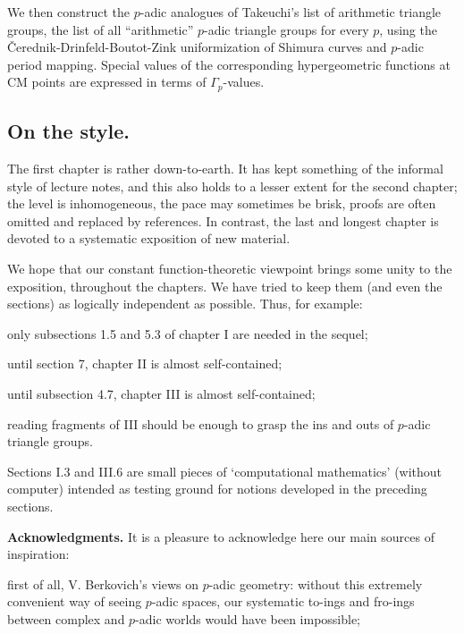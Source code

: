 We then construct the $p$-adic analogues of Takeuchi's list of
arithmetic triangle groups, \ie the list of all ``arithmetic'' $p$-adic
triangle groups for every $p$, using the 
\v{C}erednik-Drinfeld-Boutot-Zink uniformization of Shimura curves and
$p$-adic period mapping. Special values of the corresponding
hypergeometric functions at CM points are expressed in terms of
$\Gamma_p$-values.

\medskip

\subsection*{On the style.} 

\medskip

The first chapter is rather down-to-earth. It has kept
something of the informal style of lecture notes, and this also holds to
a lesser extent for the second chapter; the level is inhomogeneous, the
pace may sometimes be brisk, proofs are often omitted and replaced by
references.  In contrast, the last and longest chapter is devoted to a
systematic exposition of new material.

We hope that our constant function-theoretic viewpoint brings some unity
to the exposition, throughout the chapters.  We have tried to keep them
(and even the sections) as logically independent as possible. Thus, for
example:

only subsections 1.5 and 5.3 of chapter I are needed in the sequel;

until section 7, chapter II is almost self-contained;

until subsection 4.7, chapter III is almost self-contained;

reading fragments of III should be enough to grasp the ins and outs
of $p$-adic triangle groups.
 
\medskip

Sections I.3 and III.6 are small pieces of `computational mathematics'
(without computer) intended as testing ground for notions developed in
the preceding sections.

\bigskip

{\bf Acknowledgments.}
It is a pleasure to acknowledge here our main sources of inspiration:


first of all, V. Berkovich's views on $p$-adic geometry: without this
extremely convenient way of seeing $p$-adic spaces, our systematic
to-ings and fro-ings between complex and $p$-adic worlds would have 
been impossible;

